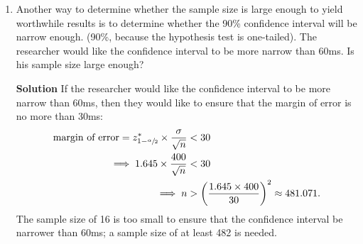 \begin{enumerate}
\begin{enumerate}
        \item Another way to determine whether the sample size is large enough to yield worthwhile results is to determine whether the 90\% confidence interval will be narrow enough. (90\%, because the hypothesis test is one-tailed). The researcher would like the confidence interval to be more narrow than 60ms. Is his sample size large enough?
        \begin{framed}{\textbf{Solution}}
        If the researcher would like the confidence interval to be more narrow than 60ms, then they would like to ensure that the margin of error is no more than 30ms:
        \begin{align}
            \text{margin of error} = z_{1 - \sfrac{\alpha}{2}}^* \times \frac{\sigma}{\sqrt{n}} &< 30 \\
            \implies 1.645 \times \frac{400}{\sqrt{n}} &<30 \\
            \implies n &> \left( \frac{1.645 \times 400}{30}\right)^2 \approx 481.071.
        \end{align}
        The sample size of 16 is too small to ensure that the confidence interval be narrower than 60ms; a sample size of at least 482 is needed.
        \end{framed}
        

\end{enumerate}
\end{enumerate}
